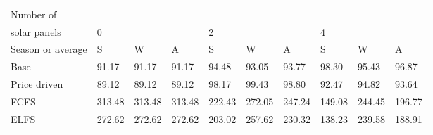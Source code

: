 \begin{table}[h] 
\centering 
\begin{tabular}{l|lll|lll|lll}Number of \\ solar panels&0& & &2& & &4& & \\ \hline 
Season or average & S & W & A & S & W & A & S & W & A \\ \hline 
Base&91.17&91.17&91.17&94.48&93.05&93.77&98.30&95.43&96.87 \\ 
Price driven&89.12&89.12&89.12&98.17&99.43&98.80&92.47&94.82&93.64 \\ 
FCFS&313.48&313.48&313.48&222.43&272.05&247.24&149.08&244.45&196.77 \\ 
ELFS&272.62&272.62&272.62&203.02&257.62&230.32&138.23&239.58&188.91 \\ 
\end{tabular} 
\end{table}